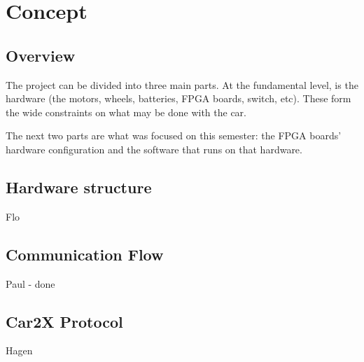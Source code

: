 \chapter{Concept}

\section{Overview}
The project can be divided into three main parts. At the fundamental level, is the hardware (the motors, wheels, batteries, FPGA boards, switch, etc). These form the wide constraints on what may be done with the car.

The next two parts are what was focused on this semester: the FPGA boards' hardware configuration and the software that runs on that hardware.


\section{Hardware structure}
Flo

\section{Communication Flow}
Paul - done

\section{Car2X Protocol}
Hagen
